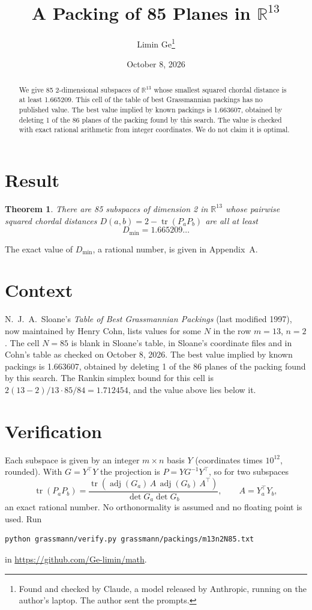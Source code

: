 \documentclass[11pt,a4paper]{article}
\title{A Packing of 85 Planes in $\mathbb{R}^{13}$}
\author{Limin Ge\thanks{Found and checked by Claude, a model released by Anthropic, running on the author's laptop. The author sent the prompts.}}
\date{October 8, 2026}
\newtheorem*{theorem}{Theorem}
\begin{document}
\maketitle
\begin{abstract}
We give 85 2-dimensional subspaces of $\mathbb{R}^{13}$ whose smallest squared chordal distance is at least 1.665209. This cell of the table of best Grassmannian packings has no published value. The best value implied by known packings is 1.663607, obtained by deleting 1 of the 86 planes of the packing found by this search. The value is checked with exact rational arithmetic from integer coordinates. We do not claim it is optimal.
\end{abstract}

\section{Result}
\begin{theorem}
There are 85 subspaces of dimension 2 in $\mathbb{R}^{13}$ whose pairwise squared chordal distances $D(a,b) = 2 - \operatorname{tr}(P_aP_b)$ are all at least
\[ D_{\min} = 1.665209\ldots \]
\end{theorem}
The exact value of $D_{\min}$, a rational number, is given in Appendix~A.


\section{Context}
N.~J.~A.~Sloane's \emph{Table of Best Grassmannian Packings} (last modified 1997), now maintained by Henry Cohn, lists values for some $N$ in the row $m=13$, $n=2$. The cell $N=85$ is blank in Sloane's table, in Sloane's coordinate files and in Cohn's table as checked on October 8, 2026. The best value implied by known packings is 1.663607, obtained by deleting 1 of the 86 planes of the packing found by this search. The Rankin simplex bound for this cell is $2(13-2)/13\cdot 85/84 = 1.712454$, and the value above lies below it.


\section{Verification}
Each subspace is given by an integer $m\times n$ basis $Y$ (coordinates times $10^{12}$, rounded). With $G=Y^\top Y$ the projection is $P=YG^{-1}Y^\top$, so for two subspaces
\[ \operatorname{tr}(P_aP_b)=\frac{\operatorname{tr}(\operatorname{adj}(G_a)\,A\,\operatorname{adj}(G_b)\,A^\top)}{\det G_a\det G_b},\qquad A=Y_a^\top Y_b, \]
an exact rational number. No orthonormality is assumed and no floating point is used. Run
\begin{verbatim}
python grassmann/verify.py grassmann/packings/m13n2N85.txt
\end{verbatim}
in \url{https://github.com/Ge-limin/math}.
\end{document}

